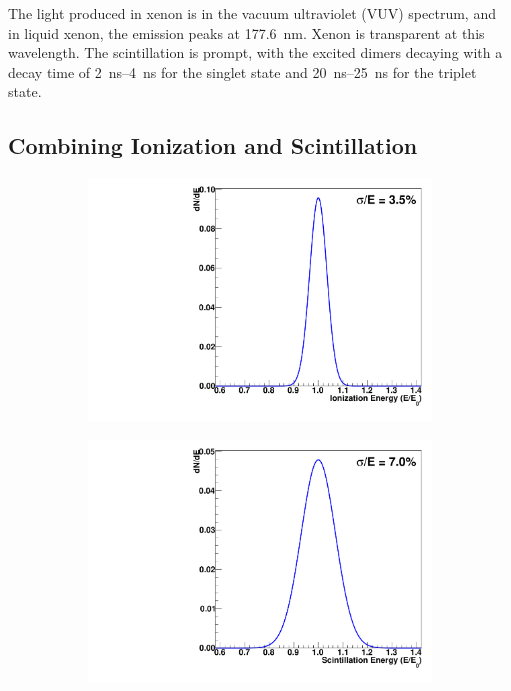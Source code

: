 \documentclass[herrin-thesis.tex]{subfiles}
\begin{document}
The light produced in xenon is in the vacuum ultraviolet (VUV) spectrum, and in liquid xenon, the emission peaks at \SI{177.6}{\nm}. Xenon is transparent at this wavelength. The scintillation is prompt, with the excited dimers decaying with a decay time of \SIrange{2}{4}{\ns} for the singlet state and \SIrange{20}{25}{\ns} for the triplet state\cite{Aprile:2010uq}.

\subsection{Combining Ionization and Scintillation}
\label{sec:xe_combining_ion_and_scint}

\begin{figure}[htb]
\centering
\begin{subfigure}[c]{0.45\linewidth}
\includegraphics[width=\textwidth]{./plots/xe_anticorrelation_ioniz.pdf}
\end{subfigure}\hspace{0.05\linewidth}\hfill%
\begin{subfigure}[c]{0.45\linewidth}
\includegraphics[width=\textwidth]{./plots/xe_anticorrelation_scint.pdf}

\end{subfigure}
\end{figure}
\end{document}
